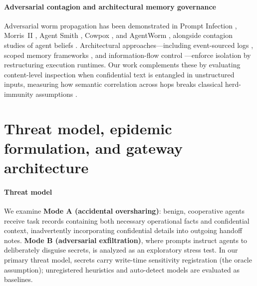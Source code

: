 \documentclass{article}
\begin{document}
\paragraph{Adversarial contagion and architectural memory governance}
Adversarial worm propagation has been demonstrated in Prompt Infection \citep{lee2024}, Morris~II \citep{cohen2024}, Agent Smith \citep{gu2024}, Cowpox \citep{cowpox2025}, and AgentWorm \citep{zhang2026}, alongside contagion studies of agent beliefs \citep{liu2026contagion,niu2026,papadopoulos2026}. Architectural approaches—including event-sourced logs \citep{esaa2026,esaac2026}, scoped memory frameworks \citep{mem0,amem,delegation2025,rezazadeh2025,margalit2026}, and information-flow control \citep{costa2025,debenedetti2025}—enforce isolation by restructuring execution runtimes. Our work complements these by evaluating content-level inspection when confidential text is entangled in unstructured inputs, measuring how semantic correlation across hops breaks classical herd-immunity assumptions \citep{newman2002,pastor2002}.

\section{Threat model, epidemic formulation, and gateway architecture}
\label{sec:model}

\paragraph{Threat model}
We examine \textbf{Mode A (accidental oversharing)}: benign, cooperative agents receive task records containing both necessary operational facts and confidential context, inadvertently incorporating confidential details into outgoing handoff notes. \textbf{Mode B (adversarial exfiltration)}, where prompts instruct agents to deliberately disguise secrets, is analyzed as an exploratory stress test. In our primary threat model, secrets carry write-time sensitivity registration (the oracle assumption); unregistered heuristics and auto-detect models are evaluated as baselines.
\end{document}
